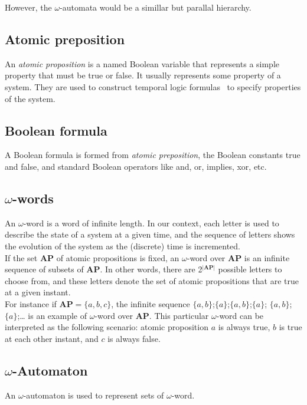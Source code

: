 \noindent However, the $\omega$-automata would be a simillar but parallal hierarchy.

\subsection{Atomic preposition}
An \textit{atomic proposition} is a named Boolean variable that represents a simple property that must be
true or false. It usually represents some property of a system. They are used to construct temporal logic
formulas~\cite{13} to specify properties of the system.

\subsection{Boolean formula}
A Boolean formula is formed from \textit{atomic preposition}, the Boolean constants true and false, and
standard Boolean operators like and, or, implies, xor, etc.

\subsection{$\omega$-words}
An $\omega$-word is a word of infinite length. In our context, each letter is used to
describe the state of a system at a given time, and the sequence of letters shows the evolution of the
system as the (discrete) time is incremented.\\

If the set \textbf{AP} of atomic propositions is fixed, an $\omega$-word over \textbf{AP} is an infinite
sequence of subsets of \textbf{AP}. In other words, there are 2$^{|\textbf{AP}|}$ possible letters to
choose from, and these letters denote the set of atomic propositions that are true at a given instant.\\

For instance if \textbf{AP}$=\{a,b,c\}$, the infinite sequence $\{a,b\}$;$\{a\}$;$\{a,b\}$;$\{a\}$;
$\{a,b\}$;$\{a\}$;… is an example of $\omega$-word over \textbf{AP}. This particular $\omega$-word can be
interpreted as the following scenario: atomic proposition $a$ is always true, $b$ is true at each other
instant, and $c$ is always false.

\subsection{$\omega$-Automaton}
An $\omega$-automaton is used to represent sets of $\omega$-word.\\

